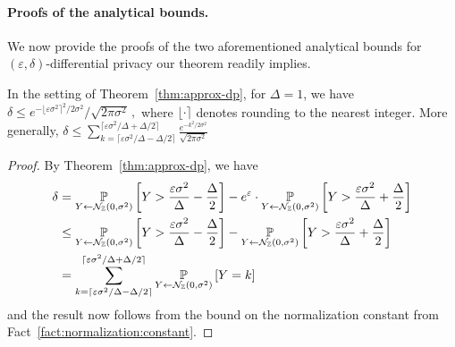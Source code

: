 \documentclass{jpc}
\newcommand{\dgausss}[2]{{\discN\left(#1,#2\right)}}
\newcommand{\dgauss}[1]{\dgausss{0}{#1}}
\newcommand{\pr}[2]{{\ifx&#1& \mathbb{P} \else
\underset{#1}{\mathbb{P}} \fi \left[#2\right]}}
\newcommand{\eps}{\varepsilon}
\begin{document}
\paragraph{Proofs of the analytical bounds.}
We now provide the proofs of the two aforementioned analytical bounds for $(\eps,\delta)$-differential privacy our theorem readily implies.
\begin{lem}
In the setting of Theorem~\ref{thm:approx-dp}, for $\Delta=1$, we have 
$
    \delta \le e^{-\lfloor \eps \sigma^2 \rceil^2/2\sigma^2}/\sqrt{2\pi\sigma^2}\,,
$
where $\lfloor\cdot\rceil$ denotes rounding to the nearest integer. More generally, $\delta \le \sum_{k=\lceil \eps\sigma^2/\Delta-\Delta/2\rceil}^{\lceil \eps\sigma^2/\Delta+\Delta/2\rceil} \frac{e^{-k^2/2\sigma^2}}{\sqrt{2\pi \sigma^2}}$
\end{lem}
\begin{proof}
By Theorem~\ref{thm:approx-dp}, we have
\begin{align*}
\delta 
&= \pr{Y \gets \dgauss{\sigma^2}}{Y > \frac{\eps \sigma^2}{\Delta}- \frac{\Delta}{2}} - e^\eps \cdot \pr{Y \gets \dgauss{\sigma^2}}{Y > \frac{\eps \sigma^2}{\Delta} + \frac{\Delta}{2}}\\
&\leq \pr{Y \gets \dgauss{\sigma^2}}{Y > \frac{\eps \sigma^2}{\Delta}- \frac{\Delta}{2}} - \pr{Y \gets \dgauss{\sigma^2}}{Y > \frac{\eps \sigma^2}{\Delta} + \frac{\Delta}{2}}\\
&= \sum_{k=\lceil \eps\sigma^2/\Delta-\Delta/2\rceil}^{\lceil \eps\sigma^2/\Delta+\Delta/2\rceil} \pr{Y \gets \dgauss{\sigma^2}}{Y = k}
\end{align*}
and the result now follows from the bound on the normalization constant from Fact~\ref{fact:normalization:constant}.
\end{proof}
\end{document}

